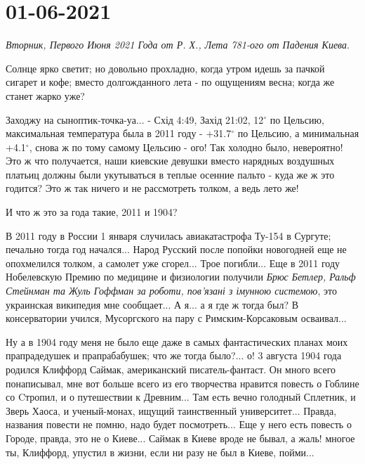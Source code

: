  
 
 
 
 

\section{01-06-2021}

\emph{Вторник, Первого Июня 2021 Года от Р. Х., Лета 781-ого от Падения Киева}.

Солнце ярко светит; но довольно прохладно, когда утром идешь за пачкой сигарет
и кофе; вместо долгожданного лета - по ощущениям весна; когда же станет жарко
уже?

Заходжу на сыноптик-точка-уа... - Схід 4:49, Захід 21:02, 12$^{\circ}$ по
Цельсию, максимальная температура была в 2011 году - +31.7$^{\circ}$ по
Цельсию, а минимальная +4.1$^{\circ}$, снова ж по тому самому Цельсию - ого!
Так холодно было, невероятно! Это ж что получается, наши киевские девушки
вместо нарядных воздушных платьиц должны были укутываться в теплые осенние
пальто - куда же ж это годится? Это ж так ничего и не рассмотреть толком, а
ведь лето же!

И что ж это за года такие, 2011 и 1904?

В 2011 году в России 1 января случилась авиакатастрофа Ту-154 в Сургуте;
печально тогда год начался... Народ Русский после попойки новогодней еще не
опохмелился толком, а самолет уже сгорел... Трое погибли...  Еще в 2011 году
Нобелевскую Премию по медицине и физиологии получили \emph{Брюс Бетлер, Ральф
Стейнман та Жуль Гоффман за роботи, пов'язані з імунною системою}, это
украинская википедия мне сообщает...  А я... а я где ж тогда был? В
консерватории учился, Мусоргского на пару с Римским-Корсаковым осваивал...

Ну а в 1904 году меня не было еще даже в самых фантастических планах моих
прапрадедушек и прапрабабушек; что же тогда было?... о! 3 августа 1904 года
родился Клиффорд Саймак, американский писатель-фантаст. Он много всего
понаписывал, мне вот больше всего из его творчества нравится повесть о Гоблине
со Cтропил, и о путешествии к Древним... Там есть вечно голодный Сплетник, и
Зверь Хаоса, и ученый-монах, ищущий таинственный университет... Правда,
названия повести не помню, надо будет посмотреть...  Еще у него есть повесть о
Городе, правда, это не о Киеве... Саймак в Киеве вроде не бывал, а жаль! многое
ты, Клиффорд, упустил в жизни, если ни разу не был в Киеве, пойми...

